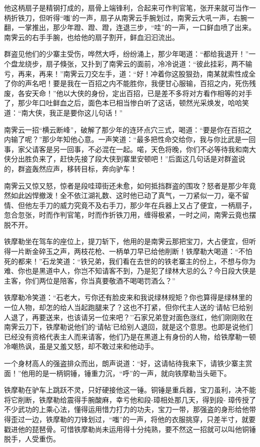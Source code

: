 \documentclass[12pt,oneside]{book}
\begin{document}
他这柄扇子是精钢打成的，扇骨上端锋利，合起来可作判官笔，张开来就可当作一柄折铁刀，但听得``嗤'的一声，扇子从南霁云手腕划过，南霁云大吼一声，右腕一翻，一掌推出，那少年蹬、蹬、蹬，连退三步，``哇''的一声，一口鲜血喷了出来。南霁云的右手手腕，也给他的扇子割开，鲜血汩汩流出。

群盗见他们的少寨主受伤，哗然大呼，纷纷涌上，那少年喝道：``都给我退开！''一个盘龙绕步，扇子倏张，又扑到了南霁云的面前，冷冷说道：``彼此挂彩，两不输亏，再来，再来！''南霁云刀交左手，道：``好！冲着你这股狠劲，南某就索性成全了你的声名吧！要是我在一百招之内不能胜你，我便甘心服输，百招之内，死伤残废，各安天命！''他以大侠的身份，定出百招，已是差不多将对方看作相等的对手了，那少年口吐鲜血之后，面色本已相当惨白听了这话，顿然光采焕发，哈哈笑道：``南大侠，我正是要你这儿句话！''

南霁云一招``横云断峰''，破解了那少年的连环点穴三式，喝道：``要是你在百招之内输了呢？''那少年知他心意。一声笑道：``最多把性命交给你，我与你比武是一回事，家父请客是另一回事，不必混在一起。喏，天色将晚，你们不必等待我和南大侠分出胜负来了，赶快先接了段大侠到寨里安顿吧！''后面这几句话是对群盗说的，群盗轰然应声，移转目标，奔向驴车！

南霁云又惊又怒，惊者是段哇璋街还未愈，如何抵挡群盗的围攻？怒者是那少年竟然如此凶悍撤泼！全不依江湖礼数、这时他已动了真气，一刀紧似一刀，毫不留情、但他左手刀的威力究竟不及右手刀，那少年在兵器上又占了便宜，一柄扇子，忽合忽张，时而作判官笔，时而作折铁刀用，缠得极紧，一时之间，南霁云竟也摆脱不开。

铁摩勒坐在驾车的座位上，提刀斩下，他用的是南霁云那把宝刀，大占便宜，但听得一片断金碎玉之声，两枝花枪、一柄单刀早已给他削断！铁摩勒大喝道：``不怕死的都来！''石龙笑道：``铁兄弟，我们看在去世的的铁老寨主的份上，不想与你为难、你也是黑道中人，你岂不知请客不到，乃是犯了绿林大忌的么？今日段大侠是主客，你们两位是陪客，你当真要敬酒不喝喝罚酒么？''

铁摩勒冷笑道：``石老大，亏你还有脸皮来和我说绿林规矩？你也算得是绿林里的一位人物，却怎的给人当起跑腿来了？这也不打紧，但你代主人送的`请帖'巳给别人退了，再要送来，也该请另一位来吧？''石家兄弟登对面色涨红，他们刚刚败在南霁云刀下，铁摩勒说他们的`请帖'已给别人退回，就是这个意思。也即是说他们已经没有资格代表主人而来请客，他们乃是在黑道上有身份的人物，给铁摩勒一顿冷嘲热讽，虽是又羞又怒，却不敢过来和他动手。

一个身材高人的强盗排众而出，朗声说道：``好，这请帖待我来下，请铁少寨主赏面！''他用的是一柄铜锤，锤重力沉，``呼''的一声，就向铁摩勒当头砸下。

铁摩勒在驴车上跳跃不灵，只好硬接他这一锤。铜锤是重兵器，宝刀虽利，决不能将它削断，铁摩勒给震得手腕酸麻，幸亏他和段-璋相处那几天，得到段-
璋传授了不少武功的上乘心法，懂得运用惜力打力的功夫，宝刀一带，那强盗的身形给他带得歪过一边，铁摩勒的刀锋划过，``嗤''的一声，将他的衣服挑穿，只差半寸，就要戳进他的琵琶骨。可惜铁摩勒尚未运用得十分纯熟，要不然这一招就可以叫他铜锤脱手，人受重伤。
\end{document}
